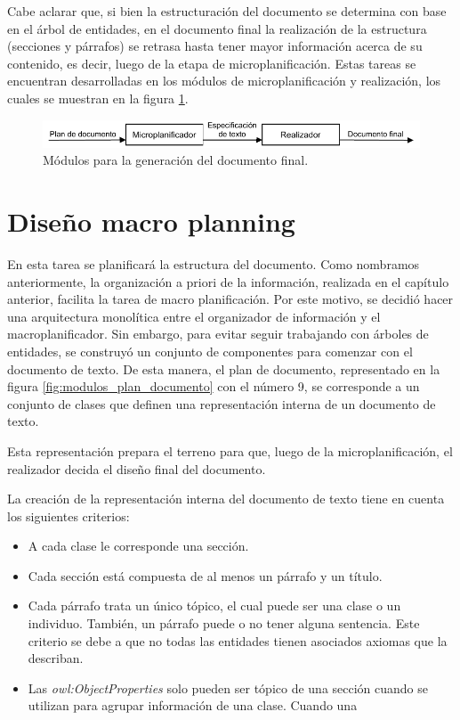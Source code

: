 Cabe aclarar que, si bien la estructuración del documento se determina con base en el árbol de entidades, en el documento final la realización de la estructura (secciones y párrafos) se retrasa hasta tener mayor información acerca de su contenido, es decir, luego de la etapa de microplanificación. Estas tareas se encuentran desarrolladas en los módulos de microplanificación y realización, los cuales se muestran en la figura \ref{fig:modulos_documento_final}.

\begin{figure}[H]
    \centering
    \includegraphics[width=12cm]{img/generacion_documento/modulos_documento_final.pdf}
    \caption{Módulos para la generación del documento final.}
    \label{fig:modulos_documento_final}
\end{figure}

\section{Diseño macro planning}
En esta tarea se planificará la estructura del documento. Como nombramos anteriormente, la organización a priori de la información, realizada en el capítulo anterior, facilita la tarea de macro planificación. Por este motivo, se decidió hacer una arquitectura monolítica entre el organizador de información y el macroplanificador. Sin embargo, para evitar seguir trabajando con árboles de entidades, se construyó un conjunto de componentes para comenzar con el documento de texto. De esta manera, el plan de documento, representado en la figura \ref{fig:modulos_plan_documento} con el número 9, se corresponde a un conjunto de clases que definen una representación interna de un documento de texto. 

Esta representación prepara el terreno para que, luego de la microplanificación, el realizador decida el diseño final del documento.

La creación de la representación interna del documento de texto tiene en cuenta los siguientes criterios:
\begin{itemize}
    \item A cada clase le corresponde una sección.
    \item Cada sección está compuesta de al menos un párrafo y un título.
    \item Cada párrafo trata un único tópico, el cual puede ser una clase o un individuo. También, un párrafo puede o no tener alguna sentencia. Este criterio se debe a que no todas las entidades tienen asociados axiomas que la describan.
    \item Las \emph{owl:ObjectProperties} solo pueden ser tópico de una sección cuando se utilizan para agrupar información de una clase. Cuando una 
\end{itemize}

